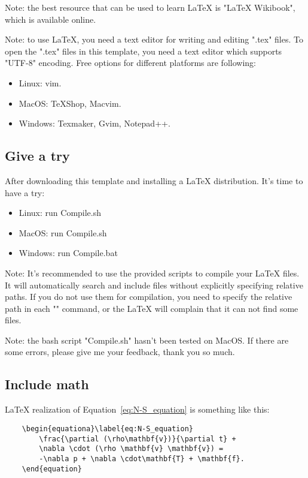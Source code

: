 Note: the best resource that can be used to learn \LaTeX{} is "\LaTeX{} Wikibook", which is available online.

Note: to use \LaTeX{}, you need a text editor for writing and editing ".tex" files. To open the ".tex" files in this template, you need a text editor which supports "UTF-8" encoding. Free options for different platforms are following:
\begin{itemize}
    \item Linux: vim. 
    \item MacOS: TeXShop, Macvim.
    \item Windows: Texmaker, Gvim, Notepad++. 
\end{itemize}

\subsection{Give a try} %
After downloading this template and installing a \LaTeX{} distribution. It's time to have a try:
\begin{itemize}
    \item Linux: run Compile.sh
    \item MacOS: run Compile.sh
    \item Windows: run Compile.bat
\end{itemize}

Note: It's recommended to use the provided scripts to compile your \LaTeX{} files. It will automatically search and include files without explicitly specifying relative paths. If you do not use them for compilation, you need to specify the relative path in each "\verb++" command, or the \LaTeX{} will complain that it can not find some files.

Note: the bash script "Compile.sh" hasn't been tested on MacOS. If there are some errors, please give me your feedback, thank you so much.


\subsection{Include math} %
\LaTeX{} realization of Equation~\ref{eq:N-S_equation} is something like this:
\begin{center}
    \small
    \begin{verbatim}
    \begin{equationa}\label{eq:N-S_equation}
        \frac{\partial (\rho\mathbf{v})}{\partial t} +
        \nabla \cdot (\rho \mathbf{v} \mathbf{v}) =
        -\nabla p + \nabla \cdot\mathbf{T} + \mathbf{f}. 
    \end{equation}    
\end{verbatim}
\end{center}

